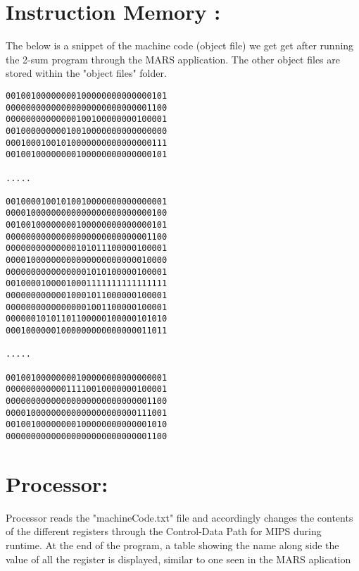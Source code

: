 \documentclass[a4paper,10pt]{article} %
\begin{document}
\section*{\Huge{\textbf{Instruction Memory :}}}
The below is a snippet of the machine code (object file) we get get after running the 2-sum program through the MARS application. The other object files are stored within the "object files" folder.
\begin{codebox} 
\begin{lstlisting}[language=binary]
00100100000000100000000000000101
00000000000000000000000000001100
00000000000000100100000000100001
00100000000010010000000000000000
00010001001010000000000000000111
00100100000000100000000000000101

.....

00100001001010010000000000000001
00001000000000000000000000000100
00100100000000100000000000000101
00000000000000000000000000001100
00000000000000101011100000100001
00001000000000000000000000010000
00000000000000001010100000100001
00100001000010001111111111111111
00000000000010001011000000100001
00000000000000001001100000100001
00000010101101100000100000101010
00010000001000000000000000011011

.....

00100100000000100000000000000001
00000000000011110010000000100001
00000000000000000000000000001100
00001000000000000000000000111001
00100100000000100000000000001010
00000000000000000000000000001100

\end{lstlisting} 
\end{codebox}

\newpage

\section*{\huge{\textbf{Processor:}}}

Processor reads the "machineCode.txt" file and accordingly changes the contents of the different registers through the Control-Data Path for MIPS during runtime.
At the end of the program, a table showing the name along side the value of all the register is displayed, similar to one seen in the MARS aplication
\end{document}
